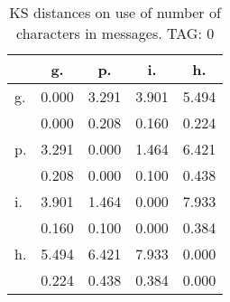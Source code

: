\begin{table}[h!]
\begin{center}
\begin{tabular}{| l | c | c | c | c |}\hline
 & g. & p. & i. & h. \\\hline
g. & 0.000  & 3.291  & 3.901  & 5.494 \\\hline
 & 0.000  & 0.208  & 0.160  & 0.224 \\\hline
p. & 3.291  & 0.000  & 1.464  & 6.421 \\\hline
 & 0.208  & 0.000  & 0.100  & 0.438 \\\hline
i. & 3.901  & 1.464  & 0.000  & 7.933 \\\hline
 & 0.160  & 0.100  & 0.000  & 0.384 \\\hline
h. & 5.494  & 6.421  & 7.933  & 0.000 \\\hline
 & 0.224  & 0.438  & 0.384  & 0.000 \\\hline
\end{tabular}
\caption{KS distances on use of number of characters in messages. TAG: 0}
\end{center}
\end{table}
